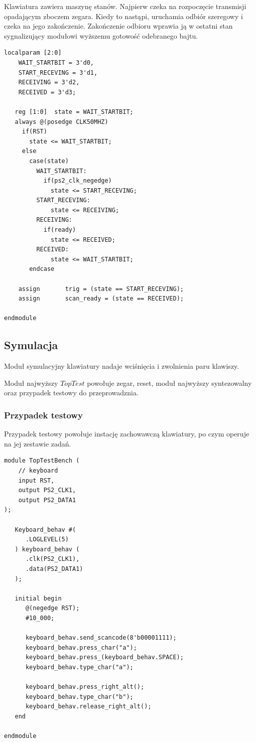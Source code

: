 \documentclass[a4paper,12pt]{article}
\begin{document}
Klawiatura zawiera maszynę stanów. Najpierw czeka na rozpoczęcie transmisji opadającym zboczem zegara. Kiedy to nastąpi, uruchamia odbiór szeregowy i czeka na jego zakończenie. Zakończenie odbioru wprawia ją w ostatni stan sygnalizujący modułowi wyższemu gotowość odebranego bajtu.
\begin{lstlisting}[label=Keyboard,caption=Keyboard.v,firstnumber=46]
   localparam [2:0]
    WAIT_STARTBIT = 3'd0,
    START_RECEVING = 3'd1,
    RECEIVING = 3'd2,
    RECEIVED = 3'd3;

   reg [1:0]  state = WAIT_STARTBIT;
   always @(posedge CLK50MHZ)
     if(RST)
       state <= WAIT_STARTBIT;
     else
       case(state)
         WAIT_STARTBIT:
           if(ps2_clk_negedge)
             state <= START_RECEVING;
         START_RECEVING:
             state <= RECEIVING;
         RECEIVING:
           if(ready)
             state <= RECEIVED;
         RECEIVED:
             state <= WAIT_STARTBIT;
       endcase

    assign       trig = (state == START_RECEVING);
    assign       scan_ready = (state == RECEIVED);

endmodule
\end{lstlisting}


\subsection{Symulacja}

Moduł symulacyjny klawiatury nadaje wciśnięcia i zwolnienia paru klawiszy.

Moduł najwyższy $TopTest$ powołuje zegar, reset, moduł najwyższy syntezowalny oraz przypadek testowy do przeprowadznia.

\subsubsection{Przypadek testowy}

Przypadek testowy powołuje instację zachowawczą klawiatury, po czym operuje na jej zestawie zadań.
\begin{lstlisting}[label=TopTestBench,caption=TopTestBench.v]
module TopTestBench (
    // keyboard
    input RST,
    output PS2_CLK1,
    output PS2_DATA1
);

   Keyboard_behav #(
      .LOGLEVEL(5)
   ) keyboard_behav (
      .clk(PS2_CLK1),
      .data(PS2_DATA1)
   );

   initial begin
      @(negedge RST);
      #10_000;

      keyboard_behav.send_scancode(8'b00001111);
      keyboard_behav.press_char("a");
      keyboard_behav.press_(keyboard_behav.SPACE);
      keyboard_behav.type_char("a");

      keyboard_behav.press_right_alt();
      keyboard_behav.type_char("b");
      keyboard_behav.release_right_alt();
   end

endmodule
\end{lstlisting}
\end{document}
